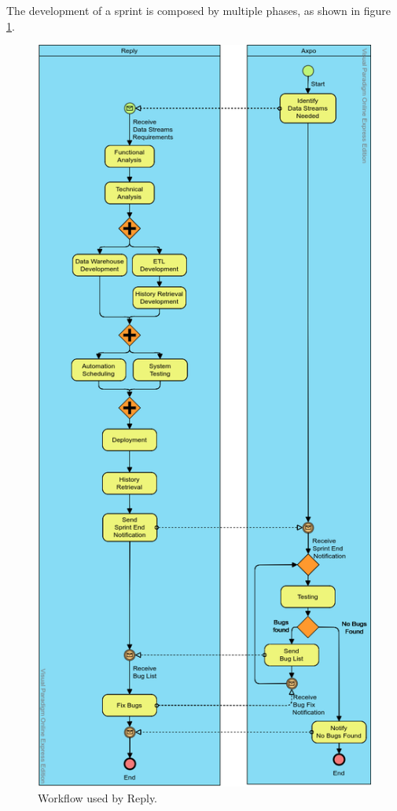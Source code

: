 The development of a sprint is composed by multiple phases, as shown in figure \ref{fig:reply:workflow}.

\begin{figure}
    \centering
    \includegraphics[width=\textwidth,height=\textheight,keepaspectratio]{res/reply_workflow.png}
    \caption{Workflow used by Reply.}
    \label{fig:reply:workflow}
\end{figure}

